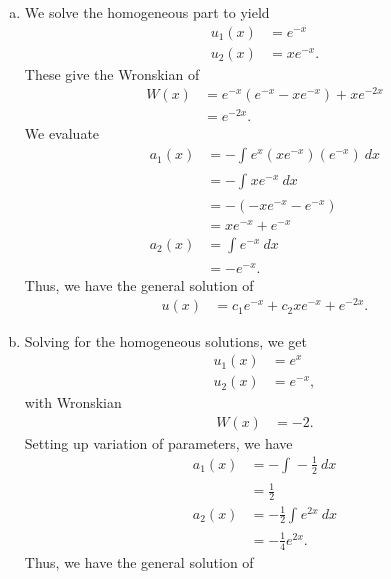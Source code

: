 \documentclass[10pt]{mypackage}
\begin{document}
\begin{solution}[39.7]\hfill
  \begin{enumerate}[(a)]
    \item We solve the homogeneous part to yield
      \begin{align*}
        u_1(x) &= e^{-x}\\
        u_2(x) &= xe^{-x}.
      \end{align*}
      These give the Wronskian of
      \begin{align*}
        W(x) &= e^{-x}\left( e^{-x} - xe^{-x} \right) + xe^{-2x}\\
             &= e^{-2x}.
      \end{align*}
      We evaluate
      \begin{align*}
        a_1(x) &= - \int_{}^{} e^{x}\left( xe^{-x} \right)\left( e^{-x} \right)\:dx\\
               &= - \int_{}^{} xe^{-x}\:dx\\
               &= -\left( -xe^{-x} - e^{-x} \right)\\
               &= xe^{-x} + e^{-x}\\
        a_2(x) &= \int_{}^{} e^{-x}\:dx\\
               &= -e^{-x}.
      \end{align*}
      Thus, we have the general solution of
      \begin{align*}
        u(x) &= c_1e^{-x} + c_2xe^{-x} + e^{-2x}.
      \end{align*}
    \item Solving for the homogeneous solutions, we get
      \begin{align*}
        u_1(x) &= e^{x}\\
        u_2(x) &= e^{-x},
      \end{align*}
      with Wronskian
      \begin{align*}
        W(x) &= -2.
      \end{align*}
      Setting up variation of parameters, we have
      \begin{align*}
        a_1(x) &= - \int_{}^{} -\frac{1}{2}\:dx\\
               &= \frac{1}{2}\\
        a_2(x) &= -\frac{1}{2} \int_{}^{} e^{2x}\:dx\\
               &= -\frac{1}{4}e^{2x}.
      \end{align*}
      Thus, we have the general solution of
      \begin{align*}

\end{align*}
\end{enumerate}
\end{solution}
\end{document}
